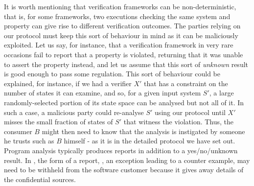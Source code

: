 It is worth mentioning that verification frameworks can be non-deterministic, that is, for some frameworks, two executions checking the same system and property can give rise to different verification outcomes. The parties relying on our protocol must keep this sort of behaviour in mind as it can be maliciously exploited. Let us say, for instance, that a verification framework in very rare occasions fail to report that a property is violated, returning that it was unable to assert the property instead, and let us assume that this sort of \emph{unknown} result is good enough to pass some regulation. This sort of behaviour could be explained, for instance, if we had a verifier $X'$ that has a constraint on the number of states it can examine, and so, for a given input system $S'$, a large randomly-selected portion of its state space can be analysed but not all of it. In such a case, a malicious party could re-analyse $S'$ using our protocol until $X'$ misses the small fraction of states of $S'$ that witness the violation. Thus, the consumer $B$ might then need to know that the \tcpa analysis is instigated by someone he trusts such as $B$ himself - as it is in the detailed protocol we have set out. 
Program analysis typically produces reports in addition to a yes/no/unknown result. In \tcpa, the form of a report, \eg, 
an exception leading to a counter example, may need to be withheld from the software customer because it gives away details of 
the confidential sources.
